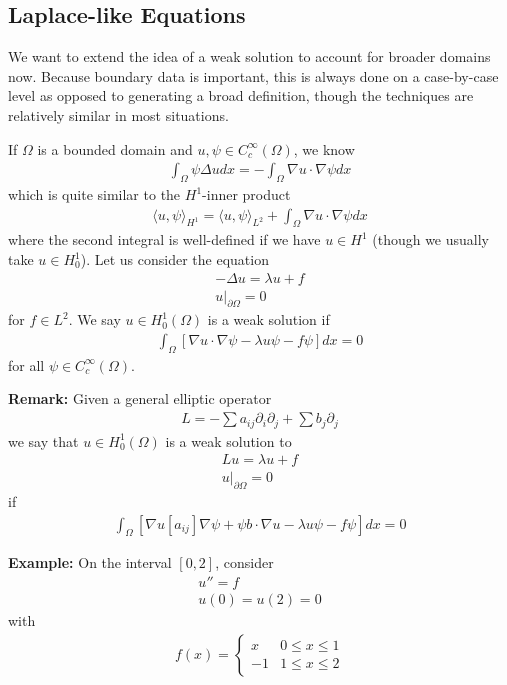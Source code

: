 \documentclass{article}
\newcommand{\pd}{\partial}
\newcommand{\CC}{C_{c}^{\infty}}
\begin{document}
	\subsection{Laplace-like Equations}
	
	We want to extend the idea of a weak solution to account for broader domains now. Because boundary data is important, this is always done on a case-by-case level as opposed to generating a broad definition, though the techniques are relatively similar in most situations.
	
	If $\Omega$ is a bounded domain and $u, \psi \in \CC(\Omega)$, we know 
	\begin{align*}
		\int_{\Omega} \psi \Delta u dx = -\int_{\Omega} \nabla u \cdot \nabla \psi dx
	\end{align*}
	which is quite similar to the $H^{1}$-inner product
	\begin{align*}
		\langle u,\psi \rangle_{H^{1}} = \langle u,\psi \rangle_{L^{2}} + \int_{\Omega} \nabla u \cdot \nabla \psi dx
	\end{align*}
	where the second integral is well-defined if we have $u \in H^{1}$ (though we usually take $u \in H^{1}_{0}$). Let us consider the equation 
	\begin{align*}
		-\Delta u = \lambda u +f \\
		u|_{\pd \Omega} = 0
	\end{align*}
	for $f \in L^{2}$. We say $u \in H^{1}_{0}(\Omega)$ is a weak solution if 
	\begin{align*}
		\int_{\Omega} \left[ \nabla u \cdot \nabla \psi - \lambda u \psi -f\psi \right]dx = 0
	\end{align*}
	for all $\psi \in \CC(\Omega)$. 
	
	\vspace{0.25 cm}
	\textbf{Remark:} Given a general elliptic operator 
	\begin{align*}
		L = -\sum a_{ij} \pd_{i}\pd_{j} + \sum b_{j} \pd_{j}
	\end{align*}
	we say that $u \in H^{1}_{0}(\Omega)$ is a weak solution to 
	\begin{align*}
		Lu = \lambda u + f \\
		u|_{\pd \Omega} = 0
	\end{align*}
	if 
	\begin{align*}
		\int_{\Omega} \left[ \nabla u [a_{ij}] \nabla \psi + \psi b \cdot \nabla u - \lambda u \psi -f\psi \right]dx = 0
	\end{align*}
	
	\vspace{0.25 cm}
	\textbf{Example:} On the interval $[0,2]$, consider
	\begin{align*}
		u'' = f \\
		u(0)=u(2)=0
	\end{align*}
	with 
	\begin{align*}
		f(x) = \begin{cases}
			x & 0 \leq x \leq 1 \\ -1 & 1 \leq x \leq 2
		\end{cases}
	\end{align*}
	
\end{document}
